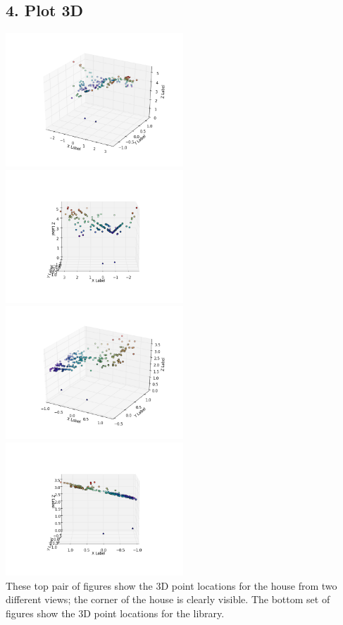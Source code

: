 \documentclass{article}\usepackage{amsmath,amssymb,amsthm,tikz,tkz-graph,color,chngpage,soul,hyperref,csquotes,graphicx,floatrow}\newcommand*{\QEDB}{\hfill\ensuremath{\square}}\newtheorem*{prop}{Proposition}\renewcommand{\theenumi}{\alph{enumi}}\usepackage[shortlabels]{enumitem}\usepackage[nobreak=true]{mdframed}\usetikzlibrary{matrix,calc}\MakeOuterQuote{"}\usepackage[margin=0.95in]{geometry} \newtheorem{theorem}{Theorem}
\begin{document}
\newpage

\subsection*{4. Plot 3D}

\begin{mdframed}


\includegraphics[width=0.5\textwidth]{house.png}
\includegraphics[width=0.5\textwidth]{house_top.png}\\
\includegraphics[width=0.5\textwidth]{library.png}
\includegraphics[width=0.5\textwidth]{library_top.png}\\
These top pair of figures show the 3D point locations for the house from two different views; the corner of the house is clearly visible. The bottom set of figures show the 3D point locations for the library.  
\end{mdframed}
\end{document}
